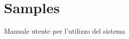 \chapter{Samples}
\label{appendixD}
\thispagestyle{empty}

\noindent Manuale utente per l'utilizzo del sistema